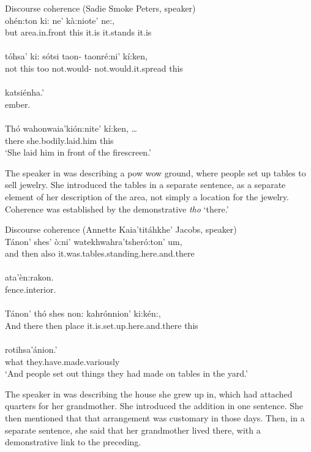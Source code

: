 \documentclass[output=paper,colorlinks,citecolor=brown]{langscibook}
\begin{document}
\ea\label{ex:mithun:13}Discourse coherence (Sadie Smoke Peters, speaker)\\
 ohén:ton        ki:   ne'     kà:niote'    ne:,  \\
      but       {area.in.front} this {it.is} {it.stands}  {it.is}\\
\medskip\\
\gll tóhsa' ki:  sótsi taon- taonré:ni' kí:ken,\\
     not  this   too  {not.would-}  {not.would.it.spread} this\\
\medskip\\
\gll katsiénha.'\\
     ember.\\
\medskip\\
\gll Thó wahonwaia'kión:nite' kí:ken,  \ldots \\
     there  {she.bodily.laid.him} this\\
\glt  `She laid him in front of the firescreen.'
\z

The speaker in  was describing a pow wow ground, where people set up tables to sell jewelry. She introduced the tables in a separate sentence, as a separate element of her description of the area, not simply a location for the jewelry. Coherence was established by the demonstrative \emph{tho} `there.'

\ea\label{ex:mithun:14}Discourse coherence (Annette Kaia'titáhkhe' Jacobs, speaker)\\
\gll Tánon' shes' ò:ni' {watekhwahra'tsheró:ton' um},\\
     and then  also  {it.was.tables.standing.here.and.there}\\
\medskip\\
\gll ata'èn:rakon.\\
     {fence.interior}.\\
\medskip\\
\gll Tánon' thó shes non: kahrónnion' ki:kén:,\\
     And  there  then  place {it.is.set.up.here.and.there}  this\\
\medskip\\
 rotihsa'ánion.'\\
what {they.have.made.variously}\\
\glt `And people set out things they had made on tables in the yard.'
\z

The speaker in  was describing the house she grew up in, which had attached quarters for her grandmother. She introduced the addition in one sentence. She then mentioned that that arrangement was customary in those days. Then, in a separate sentence, she said that her grandmother lived there, with a demonstrative link to the preceding.
\end{document}
